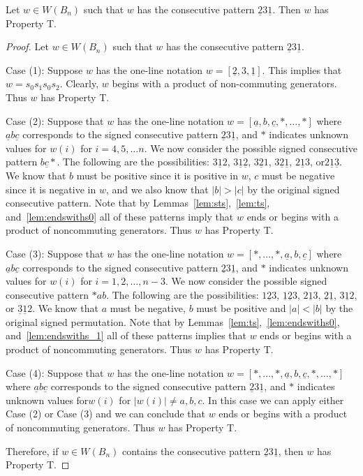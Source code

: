 \begin{lemma}\label{lem:2312}
Let $w \in W(B_n)$ such that $w$ has the consecutive pattern $\underline{2}3\underline{1}$. Then $w$ has Property T.
\begin{proof}
	Let $w \in W(B_n)$ such that $w$ has the consecutive pattern $\underline{2}3\underline{1}$.
	
	Case (1): Suppose $w$ has the one-line notation $w=[\underline{2},3,\underline{1}]$. This implies that $w=s_0s_1s_0s_2$. Clearly, $w$ begins with a product of non-commuting generators. Thus $w$ has Property T.
	
	Case (2): Suppose that $w$ has the one-line notation $w=[\underline{a},b,\underline{c}, \ast, \ldots, \ast]$ where $\underline{a}b\underline{c}$ corresponds to the signed consecutive pattern $\underline{2}3\underline{1}$, and $\ast$ indicates unknown values for $w(i)$ for $i=4,5, \ldots n$. We now consider the possible signed consecutive pattern $b \underline{c} \ast$. The following are the possibilities: $3\underline{1}2$, $3\underline{1}\underline{2}$, $3\underline{2}1$, $3 \underline{2}\underline{1}$, $2\underline{1}3$, or$2\underline{1}\underline{3}$. We know that $b$ must be positive since it is positive in $w$, $c$ must be negative since it is negative in $w$, and we also know that $|b|>|c|$ by the original signed consecutive pattern. Note that by Lemmas~\ref{lem:sts},~\ref{lem:ts}, and~\ref{lem:endswiths0} all of these patterns imply that $w$ ends or begins with a product of noncommuting generators. Thus $w$ has Property T.
	
	Case (3): Suppose that $w$ has the one-line notation $w=[\ast, \ldots, \ast, \underline{a},b,\underline{c}]$ where $\underline{a}b\underline{c}$ corresponds to the signed consecutive pattern $\underline{2}3\underline{1}$, and $\ast$ indicates unknown values for $w(i)$ for $i=1,2, \ldots ,n-3$. We now consider the possible signed consecutive pattern $\ast ab$. The following are the possibilities: $1 \underline{2} 3$, $\underline{1} \underline{2} 3$, $2 \underline{1} 3$, $\underline{2} \underline{1} $, $3 \underline{1} 2$, or $\underline{3} \underline{1} 2$. We know that $a$ must be negative, $b$ must be positive and $|a|<|b|$ by the original signed permutation. Note that by Lemmas~\ref{lem:ts},~\ref{lem:endswiths0}, and~\ref{lem:endswiths_1} all of these patterns implies that $w$ ends or begins with a product of noncommuting generators. Thus $w$ has Property T. 

	Case (4): Suppose that $w$ has the one-line notation $w=[\ast, \ldots,\ast, \underline{a},b,\underline{c}, \ast, \ldots, \ast]$ where $\underline{a}b\underline{c}$ corresponds to the signed consecutive pattern $\underline{2}3\underline{1}$, and $\ast$ indicates unknown values for$w(i)$ for $|w(i)|\neq a,b,c$. In this case we can apply either Case (2) or Case (3) and we can conclude that $w$ ends or begins with a product of noncommuting generators. Thus $w$ has Property T.

	Therefore, if $w \in W(B_n)$ contains the consecutive pattern $\underline{2}3\underline{1}$, then $w$ has Property T.
\end{proof}	
\end{lemma}

